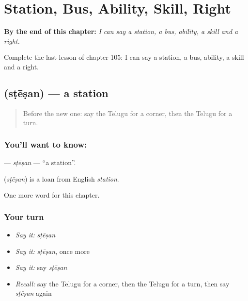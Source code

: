 
\chapter{Station, Bus, Ability, Skill, Right}
\label{ch:te-station-bus-ability-skill-right}

\begin{chapteropening}
\textbf{By the end of this chapter:} \emph{I can say a station, a bus, ability, a skill and a right.}

Complete the last lesson of chapter 105: I can say a station, a bus, ability, a skill and a right.
\end{chapteropening}

\section[\texorpdfstring{\te{స్టేషన్} (sṭēṣan)}{స్టేషన్ (sṭēṣan)}]{ (sṭēṣan) — a station}

\label{lesson:TE-C105-stesan}



\begin{quote}
Before the new one: say the Telugu for a corner, then the Telugu for a turn.
\end{quote}

\subsection*{You'll want to know: }
\textbf{} — \emph{sṭēṣan} — \textquotedblleft{}a station\textquotedblright{}.

\begin{cousinweb}
\textbf{} (\emph{sṭēṣan}) is a loan from English \emph{station}.
\end{cousinweb}

\begin{grammarlens}[title={What you've built}]
One more word for this chapter.
\end{grammarlens}

\subsection*{Your turn}
\begin{itemize}
\raggedright
  \item \emph{Say it:} \emph{sṭēṣan}
  \item \emph{Say it:} \emph{sṭēṣan}, once more
  \item \emph{Say it:} say \emph{sṭēṣan}
  \item \emph{Recall:} say the Telugu for a corner, then the Telugu for a turn, then say \emph{sṭēṣan} again
\end{itemize}

